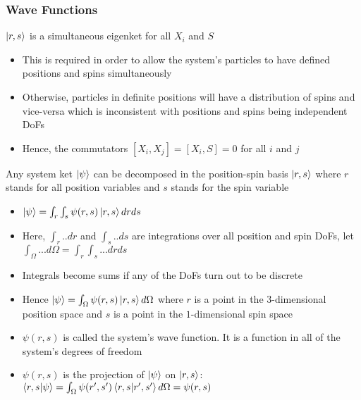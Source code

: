 \documentclass[8pt,t,mathserif,aspectratio=169]{beamer}
\begin{document}
\begin{frame}
  \frametitle{Wave Functions}
  \vspace{1mm}
  $\ket{r,s}$ is a simultaneous eigenket for all $X_i$ and $S$
  \begin{itemize}
    \item This is required in order to allow the system's particles to have defined positions and spins simultaneously
    \item Otherwise, particles in definite positions will have a distribution of spins and vice-versa which is inconsistent with positions and spins being independent DoFs
    \item Hence, the commutators $[X_i,X_j] = [X_i,S] = 0$ for all $i$ and $j$
  \end{itemize}
  Any system ket $\ket{\psi}$ can be decomposed in the position-spin basis $\ket{r,s}$ where $r$ stands for all position variables and $s$ stands for the spin variable
  \begin{itemize}
    \item $\ket{\psi} = \int_r \int_s \psi(r,s) \ket{r,s} dr ds$
    \item Here, $\int_r .. dr$ and $\int_s .. ds$ are integrations over all position and spin DoFs, let $\int_{\Omega} ... d\Omega = \int_r \int_s ... dr ds$
    \item Integrals become sums if any of the DoFs turn out to be discrete
    \item Hence $\ket{\psi} = \int_{\Omega} \psi(r,s) \ket{r,s} d\Omega$ where $r$ is a point in the $3$-dimensional position space and $s$ is a point in the $1$-dimensional spin space
    \item $\psi(r,s)$ is called the system's wave function. It is a function in all of the system's degrees of freedom
    \item $\psi(r,s)$ is the projection of $\ket{\psi}$ on $\ket{r,s}$: $\braket{r,s}{\psi} = \int_{\Omega} \psi(r',s') \braket{r,s}{r',s'} d\Omega = \psi(r,s)$
  \end{itemize}
\end{frame}
\end{document}
